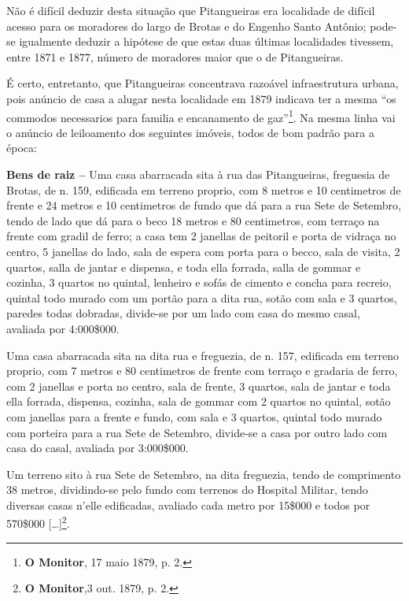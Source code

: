 Não é difícil deduzir desta situação que Pitangueiras era localidade de difícil acesso para os moradores do largo de Brotas e do Engenho Santo Antônio; pode-se igualmente deduzir a hipótese de que estas duas últimas localidades tivessem, entre 1871 e 1877, número de moradores maior que o de Pitangueiras. 

É certo, entretanto, que Pitangueiras concentrava razoável infraestrutura urbana, pois anúncio de casa a alugar nesta localidade em 1879 indicava ter a mesma ``os commodos necessarios para familia e encanamento de gaz''\footnote{\textbf{O Monitor}, 17 maio 1879, p. 2.}. Na mesma linha vai o anúncio de leiloamento dos seguintes imóveis, todos de bom padrão para a época:

\begin{citacao}
\textbf{Bens de raiz -- }Uma casa abarracada sita à rua das Pitangueiras, freguesia de Brotas, de n. 159, edificada em terreno proprio, com 8 metros e 10 centimetros de frente e 24 metros e 10 centimetros de fundo que dá para a rua Sete de Setembro, tendo de lado que dá para o beco 18 metros e 80 centimetros, com terraço na frente com gradil de ferro; a casa tem 2 janellas de peitoril e porta de vidraça no centro, 5 janellas do lado, sala de espera com porta para o becco, sala de visita, 2 quartos, salla de jantar e dispensa, e toda ella forrada, salla de gommar e cozinha, 3 quartos no quintal, lenheiro e sofás de cimento e concha para recreio, quintal todo murado com um portão para a dita rua, sotão com sala e 3 quartos, paredes todas dobradas, divide-se por um lado com casa do mesmo casal, avaliada por 4:000\$000.

Uma casa abarracada sita na dita rua e freguezia, de n. 157, edificada em terreno proprio, com 7 metros e 80 centimetros de frente com terraço e gradaria de ferro, com 2 janellas e porta no centro, sala de frente, 3 quartos, sala de jantar e toda ella forrada, dispensa, cozinha, sala de gommar com 2 quartos no quintal, sotão com janellas para a frente e fundo, com sala e 3 quartos, quintal todo murado com porteira para a rua Sete de Setembro, divide-se a casa por outro lado com casa do casal, avaliada por 3:000\$000.

Um terreno sito à rua Sete de Setembro, na dita freguezia, tendo de comprimento 38 metros, dividindo-se pelo fundo com terrenos do Hospital Militar, tendo diversas casas n'elle edificadas, avaliado cada metro por 15\$000 e todos por 570\$000 [\dots]\footnote{\textbf{O Monitor},3 out. 1879, p. 2.}.
\end{citacao}

